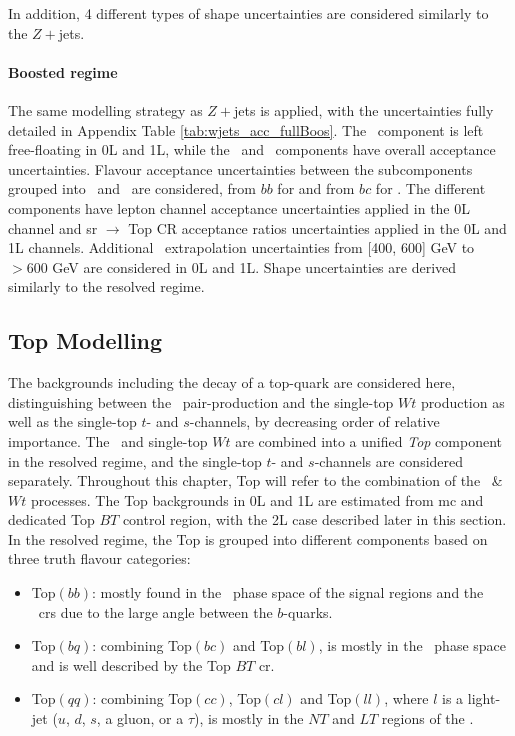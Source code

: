 In addition, 4 different types of shape uncertainties are considered similarly to the $Z+$jets.

\paragraph{Boosted regime} The same modelling strategy as $Z+$jets is applied, with the uncertainties fully detailed in Appendix Table \ref{tab:wjets_acc_fullBoos}. The \whf\ component is left free-floating in 0L and 1L, while the \wmf\ and \wlf\ components have overall acceptance uncertainties. Flavour acceptance uncertainties between the subcomponents grouped into \whf\ and  \wmf\ are considered, from $bb$ for \whf and from $bc$ for \wmf. The different components have lepton channel acceptance uncertainties applied in the 0L channel and \gls{sr} $\rightarrow$ Top CR acceptance ratios uncertainties applied in the 0L and 1L channels. Additional \ptv\ extrapolation uncertainties from [400, 600] GeV to $> 600$ GeV are considered in 0L and 1L. Shape uncertainties are derived similarly to the resolved regime. 

\subsection{Top Modelling}\label{sec-modTop} 
The backgrounds including the decay of a top-quark are considered here, distinguishing between the \ttb\ pair-production and the single-top $Wt$ production as well as the single-top $t$- and $s$-channels, by decreasing order of relative importance. The \ttb\ and single-top $Wt$ are combined into a unified \textit{Top} component in the resolved regime, and the single-top $t$- and $s$-channels are considered separately. Throughout this chapter, Top will refer to the combination of the \ttb\ \& $Wt$ processes. The Top backgrounds in 0L and 1L are estimated from \gls{mc} and dedicated Top $BT$ control region, with the 2L case described later in this section. In the resolved regime, the Top is grouped into different components based on three truth flavour categories:
\begin{itemize}
    \item Top$(bb)$: mostly found in the \vhb\ phase space of the signal regions and the \highdr\ \glspl{cr} due to the large angle between the $b$-quarks. 
    \item Top$(bq)$: combining Top$(bc)$ and Top$(bl)$, is mostly in the \vhc\ phase space and is well described by the Top $BT$ \gls{cr}.
    \item Top$(qq)$: combining Top$(cc)$, Top$(cl)$ and Top$(ll)$, where $l$ is a light-jet ($u$, $d$, $s$, a gluon, or a $\tau$), is mostly in the $NT$ and $LT$ regions of the \vhc. 
\end{itemize}

